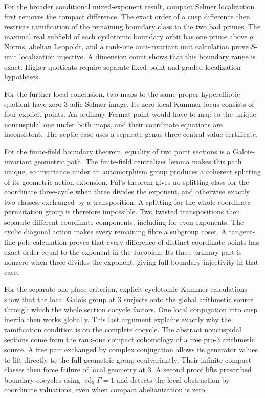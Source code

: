 \documentclass[11pt]{article}
\numberwithin{equation}{section}
\theoremstyle{definition}
\begin{document}
For the broader conditional mixed-exponent result, compact Selmer localization
first removes the compact difference. The exact order of a cusp
difference then restricts ramification of the remaining boundary
class to the two bad primes. The maximal real subfield of each
cyclotomic boundary orbit has one prime above $q$. Norms, abelian
Leopoldt, and a rank-one anti-invariant unit calculation prove
$S$-unit localization injective. A dimension count shows that this
boundary range is exact. Higher quotients require
separate fixed-point and graded localization hypotheses.

For the further local conclusion, two maps to the same proper
hyperelliptic quotient have zero $3$-adic Selmer image. Its zero
local Kummer locus consists of four explicit points. An ordinary
Fermat point would have to map to the unique noncuspidal one under
both maps, and their coordinate equations are inconsistent. The
septic case uses a separate genus-three central-value certificate.

For the finite-field boundary theorem, equality of two point sections
is a Galois-invariant geometric path. The finite-field centralizer
lemma makes this path unique, so invariance under an automorphism
group produces a coherent splitting of its geometric action
extension. P\'al's theorem gives no splitting class for
the coordinate three-cycle when three divides the exponent, and
otherwise exactly two classes, exchanged by a transposition.
A splitting for the whole coordinate permutation group is therefore
impossible. Two twisted transpositions then separate different
coordinate components, including for even exponents. The cyclic
diagonal action makes every remaining fibre a subgroup coset.
A tangent-line pole calculation proves that every difference of
distinct coordinate points has exact order equal to the exponent
in the Jacobian. Its three-primary part is nonzero when three
divides the exponent, giving full boundary injectivity in that case.

For the separate one-place criterion, explicit cyclotomic Kummer
calculations show that the local Galois group at $3$ surjects onto the
global arithmetic source through which the whole section cocycle
factors. One local conjugation into cusp inertia then works globally.
This last argument explains exactly why the ramification condition is
on the complete cocycle.
The abstract noncuspidal sections come from the rank-one compact
cohomology of a free pro-$3$ arithmetic source. A free pair exchanged
by complex conjugation allows its generator values to lift directly
to the full geometric group equivariantly. Their
infinite compact classes then force failure of local geometry at $3$.
A second proof lifts prescribed boundary cocycles using
$\operatorname{cd}_3\Gamma=1$ and detects the local obstruction by
coordinate valuations, even when compact abelianization is zero.
\end{document}
